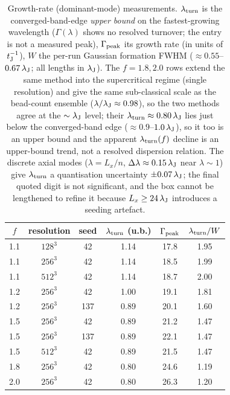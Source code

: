 \documentclass[usenatbib,twoside,twocolumn]{mnras}
\begin{document}
\begin{table}
\caption{Growth-rate (dominant-mode) measurements. $\lambda_{\rm turn}$ is the converged-band-edge \emph{upper bound} on the fastest-growing wavelength ($\Gamma(\lambda)$ shows no resolved turnover; the entry is not a measured peak), $\Gamma_{\rm peak}$ its growth rate (in units of $t_{\rm J}^{-1}$), $W$ the per-run Gaussian formation FWHM ($\approx0.55$--$0.67\,\lambda_{\rm J}$; all lengths in $\lambda_{\rm J}$). The $f=1.8,2.0$ rows extend the same method into the supercritical regime (single resolution) and give the same sub-classical scale as the bead-count ensemble ($\lambda/\lambda_{\rm J}\approx0.98$), so the two methods agree at the $\sim\lambda_{\rm J}$ level; their $\lambda_{\rm turn}\approx0.80\,\lambda_{\rm J}$ lies just below the converged-band edge ($\approx0.9$--$1.0\,\lambda_{\rm J}$), so it too is an upper bound and the apparent $\lambda_{\rm turn}(f)$ decline is an upper-bound trend, not a resolved dispersion relation. The discrete axial modes ($\lambda=L_x/n$, $\Delta\lambda\approx0.15\,\lambda_{\rm J}$ near $\lambda\sim1$) give $\lambda_{\rm turn}$ a quantisation uncertainty $\pm0.07\,\lambda_{\rm J}$; the final quoted digit is not significant, and the box cannot be lengthened to refine it because $L_x\geq24\,\lambda_{\rm J}$ introduces a seeding artefact.}
\label{tab:wave}
\footnotesize
\setlength{\tabcolsep}{4pt}
\begin{tabular}{cccccc}
\toprule
$f$ & resolution & seed & $\lambda_{\rm turn}$ (u.b.) & $\Gamma_{\rm peak}$ & $\lambda_{\rm turn}/W$ \\
\midrule
1.1 & $128^3$ & 42  & 1.14 & 17.8 & 1.95 \\
1.1 & $256^3$ & 42  & 1.14 & 18.5 & 1.99 \\
1.1 & $512^3$ & 42  & 1.14 & 18.7 & 2.00 \\
1.2 & $256^3$ & 42  & 1.00 & 19.1 & 1.81 \\
1.2 & $256^3$ & 137 & 0.89 & 20.1 & 1.60 \\
1.5 & $256^3$ & 42  & 0.89 & 21.2 & 1.47 \\
1.5 & $256^3$ & 137 & 0.89 & 22.1 & 1.47 \\
1.5 & $512^3$ & 42  & 0.89 & 21.5 & 1.47 \\
1.8 & $256^3$ & 42  & 0.80 & 24.6 & 1.19 \\
2.0 & $256^3$ & 42  & 0.80 & 26.3 & 1.20 \\
\bottomrule
\end{tabular}
\end{table}
\end{document}
